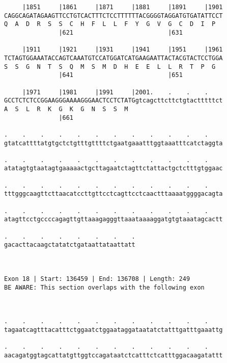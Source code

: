 \documentclass{article}
\begin{document}
\begin{Verbatim}
     |1851     |1861     |1871     |1881     |1891     |1901
CAGGCAGATAGAAGTTCCTGTCACTTTCTCCTTTTTTACGGGGTAGGATGTGATATTCCT
Q  A  D  R  S  S  C  H  F  L  L  F  Y  G  V  G  C  D  I  P  
               |621                          |631           
  
     |1911     |1921     |1931     |1941     |1951     |1961
TCTAGTGGAAATACCAGTCAAATGTCCATGGATCATGAAGAATTACTACGTACTCCTGGA
S  S  G  N  T  S  Q  M  S  M  D  H  E  E  L  L  R  T  P  G  
               |641                          |651           
  
     |1971     |1981     |1991     |2001.    .    .    .    
GCCTCTCTCCGGAAGGGAAAAGGGAACTCCTCTATGgtcagcttcttctgtactttttct
A  S  L  R  K  G  K  G  N  S  S  M                          
               |661                                         
  
.    .    .    .    .    .    .    .    .    .    .    .    
gtatcattttatgtgctctgtttgttttctgaatgaaatttggtaaatttcatctaggta
                                                            
.    .    .    .    .    .    .    .    .    .    .    .    
atatagtgtaatagtgaaaaactgcttagaatctagttctattactgctctttgtggaac
                                                            
.    .    .    .    .    .    .    .    .    .    .    .    
tttgggcaagttcttaacatccttgttcctcagttcctcaactttaaaatggggacagta
                                                            
.    .    .    .    .    .    .    .    .    .    .    .    
atagttcctgccccagagttgttaaagagggttaaataaaaggatgtgtaaatagcactt
                                                            
.    .    .    .    .    .    .    .
gacacttacaagctatatctgataattataattatt
                                    
                                    
 
Exon 18 | Start: 136459 | End: 136708 | Length: 249
BE AWARE: This section overlaps with the following exon



.    .    .    .    .    .    .    .    .    .    .    .    
tagaatcagtttacatttctggaatctggaataggataatatctatttgatttgaaattg
                                                            
.    .    .    .    .    .    .    .    .    .    .    .    
aacagatggtagcattatgttggtccagataatctcatttctcatttggacaagatattt
                                                            

\end{Verbatim}
\end{document}
